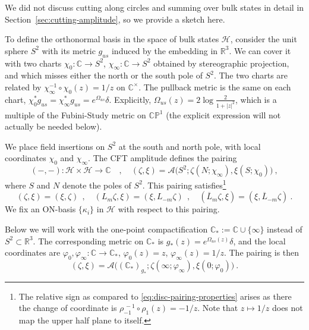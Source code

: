 \documentclass[11pt,a4paper]{article}
\numberwithin{equation}{section}
\begin{document}
We did not discuss cutting along circles and summing over bulk states in detail in Section~\ref{sec:cutting-amplitude}, so we provide a sketch here. 

To define the orthonormal basis in the space of bulk states $\mathcal{H}$,
consider the unit sphere $S^2$ with its metric $g_{us}$ induced by the embedding in $\mathbb{R}^3$. We can cover it with two charts $\chi_0 : \mathbb{C} \to S^2$, $\chi_\infty : \mathbb{C} \to S^2$ obtained by stereographic projection, and which misses either the north or the south pole of $S^2$. The two charts are related by $\chi_\infty^{-1} \circ \chi_0(z) = 1/z$ on $\mathbb{C}^\times$.
The pullback metric is the same on each chart, $\chi_0^* g_{us} = \chi_\infty^* g_{us} = e^{\Omega_{us}} \delta$. Explicitly, $\Omega_{us}(z) = 2 \log \frac{2}{1+|z|^2}$, which is a multiple of the Fubini-Study metric on $\mathbb{CP}^1$ (the explicit expression will not actually be needed below).

We place field insertions on $S^2$ at the south and north pole, with local coordinates $\chi_0$ and $\chi_\infty$. 
The CFT amplitude defines the pairing 
\begin{equation}\label{eq:sphere-pairing}
(-,-) : \mathcal{H} \times \mathcal{H} \to \mathbb{C}
\quad,\quad
(\zeta,\xi) = \mathcal{A}\big(S^2;\zeta(N;\chi_{\infty}),\xi(S;\chi_{0})\big)
\ ,
\end{equation}
where $S$ and $N$ denote the poles of $S^2$.
This pairing satisfies\footnote{
    The relative sign as compared to \eqref{eq:disc-pairing-properties} arises as there the change of coordinate is $\rho_{-1}^{\,-1} \circ \rho_1 (z) = -1/z$. Note that $z \mapsto 1/z$ does not map the upper half plane to itself.
}
\begin{equation}\label{eq:sphere-pairing-properties}
(\zeta,\xi) = (\xi,\zeta)
~~ , \quad
(L_m \zeta,\xi) = (\xi,L_{-m} \zeta)
~~ , \quad
(\overline L_m \zeta,\xi) = (\xi,\overline L_{-m} \zeta)
\ .
\end{equation}
We fix an ON-basis $\{ \kappa_i \}$ in $\mathcal{H}$ with respect to this pairing.

Below we will work with the one-point compactification $\mathbb{C}_* := \mathbb{C} \cup \{\infty\}$ instead of $S^2 \subset \mathbb{R}^3$. The corresponding metric on $\mathbb{C}_*$ is $g_*(z) = e^{\Omega_{us}(z)} \delta$, and the local coordinates are 
$\varphi_0 , \varphi_\infty: \mathbb{C} \to \mathbb{C}_*$, $\varphi_0(z)=z$, $\varphi_\infty(z)=1/z$. The pairing is then
\begin{equation}
    (\zeta,\xi) = \mathcal{A}\big((\mathbb{C}_*)_{g_*};\zeta(\infty;\varphi_{\infty}),\xi(0;\varphi_{0})\big) \ .
\end{equation}
 
\end{document}
